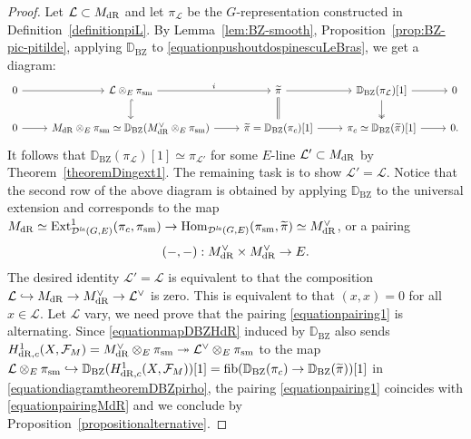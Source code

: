 \documentclass[a4paper,10pt]{amsart}
\theoremstyle{remark}
\theoremstyle{definition}
\theoremstyle{plain}
\numberwithin{equation}{section}
\newcommand{\bbD}{{\mathbb D}}
\newcommand{\calD}{{\mathcal D}}
\newcommand{\calF}{{\mathcal F}}
\newcommand{\calL}{{\mathcal L}}
\newcommand{\dR}{{\rm dR}}
\newcommand{\Ext}{{\rm Ext}}
\newcommand{\Hom}{{\rm Hom}}
\newcommand{\la}{{\it la}}
\newcommand{\sm}{{\rm sm}}
\newcommand{\BZ}{\ensuremath{\mathrm{BZ}}}
\begin{document}
\begin{proof}
	Let $\calL\subset M_{\rm dR}$ and let $\pi_{\calL}$ be the $G$-representation constructed in Definition~\ref{definitionpiL}. By Lemma~\ref{lem:BZ-smooth}, Proposition~\ref{prop:BZ-pic-pitilde}, applying $\bbD_{\BZ}$ to \eqref{equationpushoutdospinescuLeBras}, we get a diagram:
\begin{equation}\label{equationdiagramtheoremDBZpirho}
\begin{tikzcd}0 \arrow[r] & \calL\otimes_E\pi_{\sm} \arrow[r,"i"] \arrow[d, hook] & \widetilde{\pi} \arrow[r] \arrow[d, equal] & \bbD_{\BZ}(\pi_{\calL})[1] \arrow[r] \arrow[d, two heads] & 0 \\
	0 \arrow[r] & M_{\rm dR}\otimes_E\pi_{\sm}\simeq\bbD_{\BZ}(M_{\rm dR}^{\vee}\otimes_E\pi_{\sm}) \arrow[r] & \widetilde{\pi}=\bbD_{\BZ}(\pi_c)[1] \arrow[r] & \pi_c\simeq \bbD_{\BZ}(\widetilde{\pi})[1] \arrow[r] & 0.
\end{tikzcd}
\end{equation}
It follows that $\bbD_{\BZ}(\pi_{\calL})[1]\simeq \pi_{\calL'}$ for some $E$-line $\calL'\subset M_{\rm dR}$ by Theorem~\ref{theoremDingext1}. The remaining task is to show $\calL'=\calL$. Notice that the second row of the above diagram is obtained by applying $\bbD_{\BZ}$ to the universal extension and corresponds to the map $M_{\dR}\simeq \Ext^1_{\calD^{\la}(G,E)}(\pi_c,\pi_{\sm})\to \Hom_{\calD^{\la}(G,E)}(\pi_{\sm},\widetilde{\pi})\simeq M_{\rm dR}^{\vee}$, or a pairing 
\begin{equation}\label{equationpairing1}
	(-,-):M_{\dR}^{\vee}\times M_{\dR}^{\vee}\to E. 
\end{equation}
The desired identity $\calL'=\calL$ is equivalent to that the composition $\calL\hookrightarrow M_{\dR}\rightarrow M_{\dR}^{\vee}\rightarrow \calL^{\vee}$ is zero. This is equivalent to that $(x,x)=0$ for all $x\in \calL$. Let $\calL$ vary, we need prove that the pairing \eqref{equationpairing1} is alternating. Since \eqref{equationmapDBZHdR} induced by $\bbD_{\BZ}$ also sends $H_{\dR,c}^1(X,\calF_M)=M_{\dR}^{\vee}\otimes_E\pi_{\sm}\twoheadrightarrow \calL^{\vee}\otimes_{E}\pi_{\sm}$ to the map $\calL\otimes_{E}\pi_{\sm}\hookrightarrow \bbD_{\BZ}(H_{\dR,c}^1(X,\calF_M))[1]=\fib(\bbD_{\BZ}(\pi_c)\rightarrow \bbD_{\BZ}(\widetilde{\pi}))[1]$ in \eqref{equationdiagramtheoremDBZpirho}, the pairing \eqref{equationpairing1} coincides with \eqref{equationpairingMdR} and we conclude by Proposition~\ref{propositionalternative}.
\end{proof}
\end{document}
